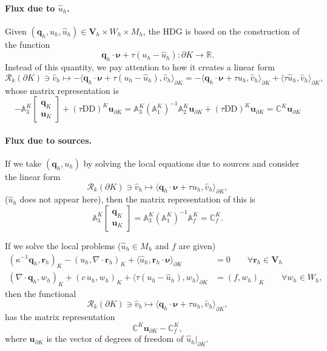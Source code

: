 \documentclass[10pt,english]{article}
\newcommand{\ds}{\displaystyle}
\begin{document}
\paragraph{Flux due to $\widehat u_h$.} Given $(\boldsymbol q_h,u_h,\widehat u_h) \in \boldsymbol V_h\times W_h \times M_h$, the HDG is based on the construction of the function
\[
\boldsymbol q_h\cdot\boldsymbol\nu+\tau (u_h-\widehat u_h): \partial K \to \mathbb R.
\]
Instead of this quantity, we pay attention to how it creates a linear form
\[
\mathcal R_k(\partial K) \ni \widehat v_h \longmapsto -\langle \boldsymbol q_h\cdot\boldsymbol\nu+\tau (u_h-\widehat u_h),\widehat v_h\rangle_{\partial K}=-\langle \boldsymbol q_h\cdot\boldsymbol\nu+\tau u_h,\widehat v_h\rangle_{\partial K}+\langle \tau \widehat u_h,\widehat v_h\rangle_{\partial K},
\]
whose matrix representation is
\[
-\mathbb A_3^K \left[\begin{array}{c} \mathbf q_K \\ \mathbf u_K\end{array}\right]+(\tau\mathrm{DD})^K\mathbf u_{\partial K}=
\mathbb A_3^K(\mathbb A_1^K)^{-1} \mathbb A_2^K \mathbf u_{\partial K}+(\tau\mathrm{DD})^K\mathbf u_{\partial K}=
\mathbb C^K \mathbf u_{\partial K}
\]

\paragraph{Flux due to sources.} If we take $(\boldsymbol q_h,u_h)$ by solving the local equations due to sources and consider the linear form
\[
\mathcal R_k(\partial K) \ni \widehat v_h \longmapsto \langle \boldsymbol q_h\cdot\boldsymbol\nu+\tau u_h,\widehat v_h\rangle_{\partial K},
\]
($\widehat u_h$ does not appear here), then the matrix representation of this is
\[
\mathbb A_3^K \left[\begin{array}{c} \mathbf q_K \\ \mathbf u_K\end{array}\right]=\mathbb A_3^K(\mathbb A_1^K)^{-1}\mathbb A_f^K = \mathbb C_f^K.
\]

If we solve the local problems ($\widehat u_h\in M_h$ and $f$ are given)
\[
\begin{array}{rl}
\ds (\kappa^{-1} \boldsymbol q_h,\boldsymbol r_h)_K  -(u_h,\nabla\cdot\boldsymbol r_h)_K  +\langle \widehat u_h,\boldsymbol r_h\cdot\boldsymbol\nu\rangle_{\partial K}&=0 \qquad \forall \boldsymbol r_h \in \boldsymbol V_h\\[1.5ex]
(\nabla\cdot\boldsymbol q_h,w_h)_K +(c\,u_h,w_h)_K +\langle \tau (u_h -\widehat u_h),w_h\rangle_{\partial K} &=(f,w_h)_K \qquad \forall w_h \in W_h,
\end{array}
\]
then the functional 
\[
\mathcal R_k(\partial K) \ni \widehat v_h \longmapsto \langle \boldsymbol q_h\cdot\boldsymbol\nu+\tau u_h,\widehat v_h\rangle_{\partial K},
\]
has the matrix representation
\[
\mathbb C^K \mathbf u_{\partial K} -\mathbb C_f^K,
\]
where $\mathbf u_{\partial K}$ is the vector of degrees of freedom of $\widehat u_h|_{\partial K}$.
\end{document}
